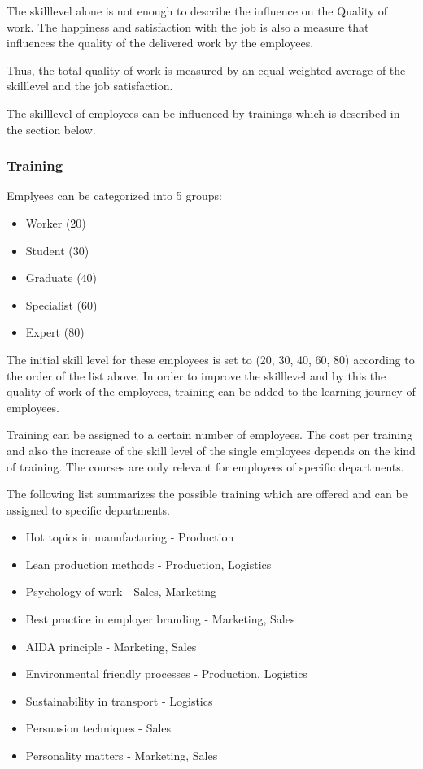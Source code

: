 The skilllevel alone is not enough to describe the influence on the Quality of work. The happiness and satisfaction with the job is also a measure that influences the quality of the delivered work by the employees. 

Thus, the total quality of work is measured by an equal weighted average of the skilllevel and the job satisfaction. 

The skilllevel of employees can be influenced by trainings which is described in the section below.


\subsubsection{Training}
Emplyees can be categorized into 5 groups:
\begin{itemize}
    \item Worker (20)
    \item Student (30)
    \item Graduate (40)
    \item Specialist (60)
    \item Expert (80)
\end{itemize}
The initial skill level for these employees is set to (20, 30, 40, 60, 80) according to the order of the list above. In order to improve the skilllevel and by this the quality of work of the employees, training can be added to the learning journey of employees. 

Training can be assigned to a certain number of employees. The cost per training and also the increase of the skill level of the single employees depends on the kind of training. The courses are only relevant for employees of specific departments.

The following list summarizes the possible training which are offered and can be assigned to specific departments.
\begin{itemize}
\item Hot topics in manufacturing - Production
\item Lean production methods - Production, Logistics
\item Psychology of work - Sales, Marketing
\item Best practice in employer branding - Marketing, Sales
\item AIDA principle - Marketing, Sales
\item Environmental friendly processes - Production, Logistics
\item Sustainability in transport - Logistics
\item Persuasion techniques - Sales
\item Personality matters - Marketing, Sales
\end{itemize}
\ \\

